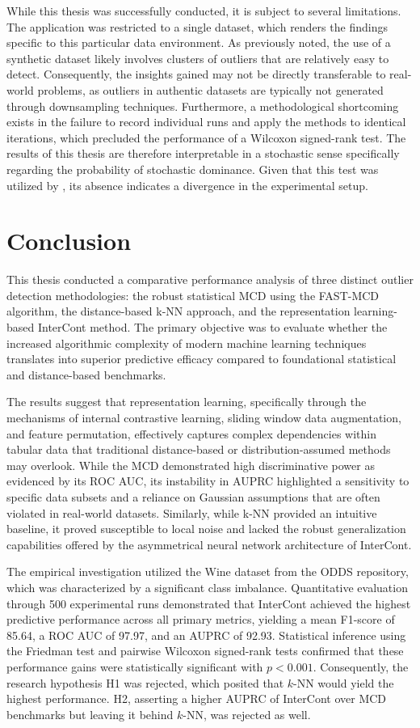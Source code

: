 While this thesis was successfully conducted, it is subject to several limitations. 
The application was restricted to a single dataset, which renders the findings specific to this particular data environment. 
As previously noted, the use of a synthetic dataset likely involves clusters of outliers that are relatively easy to detect. 
Consequently, the insights gained may not be directly transferable to real-world problems, as outliers in authentic datasets are typically not generated through downsampling techniques. 
Furthermore, a methodological shortcoming exists in the failure to record individual runs and apply the methods to identical iterations, which precluded the performance of a Wilcoxon signed-rank test.
The results of this thesis are therefore interpretable in a stochastic sense specifically regarding the probability of stochastic dominance.
Given that this test was utilized by \cite{shenkar2022anomaly}, its absence indicates a divergence in the experimental setup.


\section{Conclusion}
This thesis conducted a comparative performance analysis of three distinct outlier detection methodologies: the robust statistical MCD using the FAST-MCD algorithm, the distance-based k-NN approach, and the representation learning-based InterCont method. 
The primary objective was to evaluate whether the increased algorithmic complexity of modern machine learning techniques translates into superior predictive efficacy compared to foundational statistical and distance-based benchmarks.

\newpage
The results suggest that representation learning, specifically through the mechanisms of internal contrastive learning, sliding window data augmentation, and feature permutation, effectively captures complex dependencies within tabular data that traditional distance-based or distribution-assumed methods may overlook. 
While the MCD demonstrated high discriminative power as evidenced by its ROC AUC, its instability in AUPRC highlighted a sensitivity to specific data subsets and a reliance on Gaussian assumptions that are often violated in real-world datasets. 
Similarly, while k-NN provided an intuitive baseline, it proved susceptible to local noise and lacked the robust generalization capabilities offered by the asymmetrical neural network architecture of InterCont.


The empirical investigation utilized the Wine dataset from the ODDS repository, which was characterized by a significant class imbalance. 
Quantitative evaluation through 500 experimental runs demonstrated that InterCont achieved the highest predictive performance across all primary metrics, yielding a mean F1-score of 85.64, a ROC AUC of 97.97, and an AUPRC of 92.93. 
Statistical inference using the Friedman test and pairwise Wilcoxon signed-rank tests confirmed that these performance gains were statistically significant with $p<0.001$. 
Consequently, the research hypothesis H1 was rejected, which posited that $k$-NN would yield the highest performance.
H2, asserting a higher AUPRC of InterCont over MCD benchmarks but leaving it behind $k$-NN, was rejected as well.


